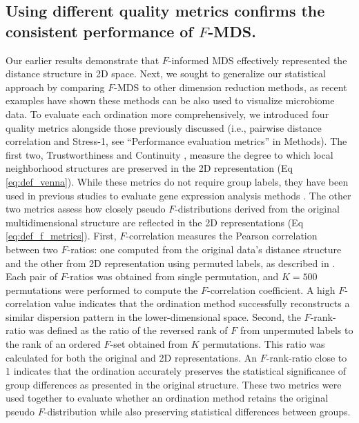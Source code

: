\documentclass[10pt,letterpaper]{article}
\newcommand{\1}{{\rm 1}\kern-0.24em{\rm I}}
\begin{document}
\subsection*{Using different quality metrics confirms the consistent performance of $F$-MDS.}
Our earlier results demonstrate that $F$-informed MDS effectively represented the distance structure in 2D space. Next, we sought to generalize our statistical approach by comparing $F$-MDS to other dimension reduction methods, as recent examples have shown these methods can be also used to visualize microbiome data. To evaluate each ordination more comprehensively, we introduced four quality metrics alongside those previously discussed (i.e., pairwise distance correlation and Stress-1, see ``Performance evaluation metrics'' in Methods). The first two, Trustworthiness and Continuity \cite{Venna01}, measure the degree to which local neighborhood structures are preserved in the 2D representation (Eq \ref{eq:def_venna}). While these metrics do not require group labels, they have been used in previous studies to evaluate gene expression analysis methods \cite{Nikkila02, Kaski03}. The other two metrics assess how closely pseudo $F$-distributions derived from the original multidimensional structure are reflected in the 2D representations (Eq \ref{eq:def_f_metrics}). First, $F$-correlation measures the Pearson correlation between two $F$-ratios: one computed from the original data's distance structure and the other from 2D representation using permuted labels, as described in \cite{Serviss17}. Each pair of $F$-ratios was obtained from single permutation, and $K=500$ permutations were performed to compute the $F$-correlation coefficient. A high $F$-correlation value indicates that the ordination method successfully reconstructs a similar dispersion pattern in the lower-dimensional space. Second, the $F$-rank-ratio was defined as the ratio of the reversed rank of $F$ from unpermuted labels to the rank of an ordered $F$-set obtained from $K$ permutations. This ratio was calculated for both the original and 2D representations. An $F$-rank-ratio close to 1 indicates that the ordination accurately preserves the statistical significance of group differences as presented in the original structure. These two metrics were used together to evaluate whether an ordination method retains the original pseudo $F$-distribution while also preserving statistical differences between groups.
\end{document}
